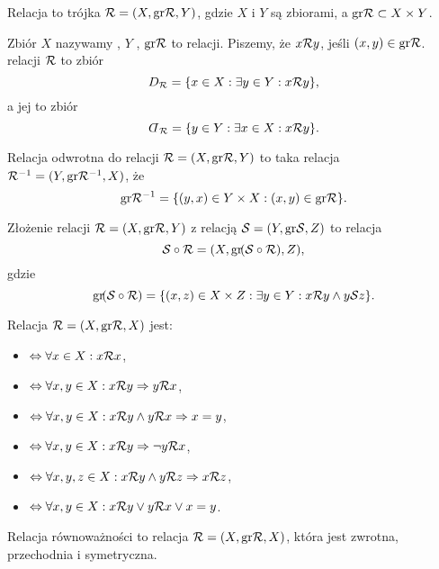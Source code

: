\begin{definition}
    Relacja to trójka $\mathcal R = (X, \operatorname{gr}\!\mathcal R, Y)$, gdzie $X$ i $Y$ są zbiorami, a $\operatorname{gr}\! \mathcal R \subset X \times Y$.
\end{definition}

Zbiór $X$ nazywamy , $Y$ , $\operatorname{gr}\! \mathcal R$ to  relacji. Piszemy, że $x \mathcal R y$, jeśli $(x, y) \in \operatorname{gr}\!\mathcal R$.  relacji $\mathcal R$ to zbiór
\[ D_\mathcal R = \{x \in X : \exists y \in Y : x \mathcal R y\}, \]
a jej  to zbiór
\[ \rotatebox[origin=c]{180}{$D$}_\sR = \{y \in Y : \exists x \in X : x \sR y\}. \]

\begin{definition}
    Relacja odwrotna do relacji $\mathcal R = (X, \operatorname{gr}\!\mathcal R, Y)$ to taka relacja $\mathcal R^{-1} = (Y, \operatorname{gr}\!\mathcal R^{-1}, X)$, że
    \[ \operatorname{gr}\! \mathcal R^{-1} = \{(y, x) \in Y \times X : (x, y) \in \operatorname{gr}\!\mathcal R\}. \]
\end{definition}

\begin{definition}
    Złożenie relacji $\mathcal R = (X, \operatorname{gr}\!\mathcal R, Y)$ z relacją $\mathcal S = (Y, \operatorname{gr}\!\mathcal S, Z)$ to relacja
    \[ \mathcal S \circ \mathcal R = (X, \operatorname{gr}\!(\mathcal S \circ \mathcal R), Z), \]
    gdzie
    \[ \operatorname{gr}\!(\mathcal S \circ \mathcal R) = \{(x, z) \in X \times Z : \exists y \in Y : x \mathcal R y \wedge y \mathcal S z\}. \]
\end{definition}

\begin{definition}
    Relacja $\mathcal R = (X, \operatorname{gr}\!\mathcal R, X)$ jest:
    \begin{itemize}
        \item {} $\Leftrightarrow \forall x\in X : x \mathcal R x$,
        \item {} $\Leftrightarrow \forall x, y \in X : x \mathcal R y \Rightarrow y \mathcal R x$,
        \item {} $\Leftrightarrow \forall x, y \in X : x \mathcal R y \wedge y \mathcal R x \Rightarrow x = y$,
        \item {} $\Leftrightarrow \forall x, y \in X : x \mathcal R y \Rightarrow \neg y \mathcal R x$,
        \item {} $\Leftrightarrow \forall x, y, z \in X : x \mathcal R y \wedge y \mathcal R z \Rightarrow x \mathcal R z$,
        \item {} $\Leftrightarrow \forall x, y \in X : x \mathcal R y \vee y \mathcal R x \vee x = y$.
    \end{itemize}
\end{definition}

\begin{definition}
    Relacja równoważności to relacja $\mathcal R = (X, \operatorname{gr}\!\mathcal R, X)$, która jest zwrotna, przechodnia i symetryczna.
\end{definition}

